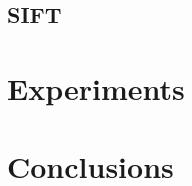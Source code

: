 \documentclass[twocolumn]{article}
\begin{document}
  \subsection{SIFT}

  \section{Experiments}

  \section{Conclusions}
\end{document}

